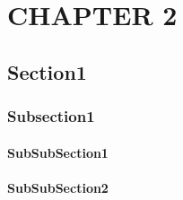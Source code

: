\chapter{CHAPTER 2}
\label{chp:chapter2}

\section{Section1}
\subsection{Subsection1}
\subsubsection{SubSubSection1}
\subsubsection{SubSubSection2}
